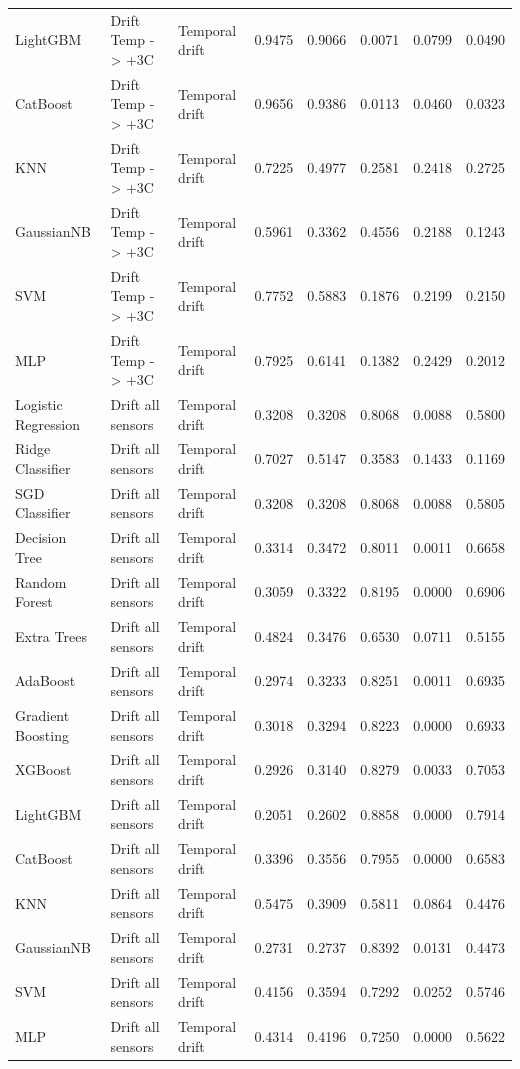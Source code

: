\begin{tabular}{lllrrrrr}
LightGBM & Drift Temp -> +3C & Temporal drift & 0.9475 & 0.9066 & 0.0071 & 0.0799 & 0.0490 \\
CatBoost & Drift Temp -> +3C & Temporal drift & 0.9656 & 0.9386 & 0.0113 & 0.0460 & 0.0323 \\
KNN & Drift Temp -> +3C & Temporal drift & 0.7225 & 0.4977 & 0.2581 & 0.2418 & 0.2725 \\
GaussianNB & Drift Temp -> +3C & Temporal drift & 0.5961 & 0.3362 & 0.4556 & 0.2188 & 0.1243 \\
SVM & Drift Temp -> +3C & Temporal drift & 0.7752 & 0.5883 & 0.1876 & 0.2199 & 0.2150 \\
MLP & Drift Temp -> +3C & Temporal drift & 0.7925 & 0.6141 & 0.1382 & 0.2429 & 0.2012 \\
Logistic Regression & Drift all sensors & Temporal drift & 0.3208 & 0.3208 & 0.8068 & 0.0088 & 0.5800 \\
Ridge Classifier & Drift all sensors & Temporal drift & 0.7027 & 0.5147 & 0.3583 & 0.1433 & 0.1169 \\
SGD Classifier & Drift all sensors & Temporal drift & 0.3208 & 0.3208 & 0.8068 & 0.0088 & 0.5805 \\
Decision Tree & Drift all sensors & Temporal drift & 0.3314 & 0.3472 & 0.8011 & 0.0011 & 0.6658 \\
Random Forest & Drift all sensors & Temporal drift & 0.3059 & 0.3322 & 0.8195 & 0.0000 & 0.6906 \\
Extra Trees & Drift all sensors & Temporal drift & 0.4824 & 0.3476 & 0.6530 & 0.0711 & 0.5155 \\
AdaBoost & Drift all sensors & Temporal drift & 0.2974 & 0.3233 & 0.8251 & 0.0011 & 0.6935 \\
Gradient Boosting & Drift all sensors & Temporal drift & 0.3018 & 0.3294 & 0.8223 & 0.0000 & 0.6933 \\
XGBoost & Drift all sensors & Temporal drift & 0.2926 & 0.3140 & 0.8279 & 0.0033 & 0.7053 \\
LightGBM & Drift all sensors & Temporal drift & 0.2051 & 0.2602 & 0.8858 & 0.0000 & 0.7914 \\
CatBoost & Drift all sensors & Temporal drift & 0.3396 & 0.3556 & 0.7955 & 0.0000 & 0.6583 \\
KNN & Drift all sensors & Temporal drift & 0.5475 & 0.3909 & 0.5811 & 0.0864 & 0.4476 \\
GaussianNB & Drift all sensors & Temporal drift & 0.2731 & 0.2737 & 0.8392 & 0.0131 & 0.4473 \\
SVM & Drift all sensors & Temporal drift & 0.4156 & 0.3594 & 0.7292 & 0.0252 & 0.5746 \\
MLP & Drift all sensors & Temporal drift & 0.4314 & 0.4196 & 0.7250 & 0.0000 & 0.5622 \\
\bottomrule
\end{tabular}
